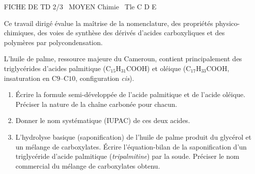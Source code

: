 \documentclass[11pt]{article}
\begin{document}
\begin{tcolorbox}[enhanced,colback=popink,colframe=popink,arc=10pt,boxrule=0pt,left=12pt,right=12pt,top=9pt,bottom=9pt]
{\color{white}\popxbold\small FICHE DE TD 2/3 \textbullet\ MOYEN \hfill Chimie \textbullet\ Tle C D E\par}
\end{tcolorbox}
\vspace{4pt}
\noindent Ce travail dirigé évalue la maîtrise de la nomenclature, des propriétés physico-chimiques, des voies de synthèse des dérivés d'acides carboxyliques et des polymères par polycondensation.

\begin{exercice}
L'huile de palme, ressource majeure du Cameroun, contient principalement des triglycérides d'acides palmitique (C$_{15}$H$_{31}$COOH) et oléique (C$_{17}$H$_{33}$COOH, insaturation en C$9$--C$10$, configuration \textit{cis}).
\begin{enumerate}
    \item Écrire la formule semi-développée de l'acide palmitique et de l'acide oléique. Préciser la nature de la chaîne carbonée pour chacun.
    \item Donner le nom systématique (IUPAC) de ces deux acides.
    \item L'hydrolyse basique (saponification) de l'huile de palme produit du glycérol et un mélange de carboxylates. Écrire l'équation-bilan de la saponification d'un triglycéride d'acide palmitique (\textit{tripalmitine}) par la soude. Préciser le nom commercial du mélange de carboxylates obtenu.
\end{enumerate}
\end{exercice}
\end{document}
